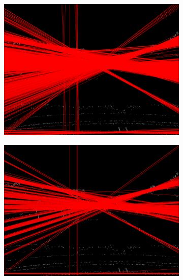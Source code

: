 \documentclass[12pt,a4paper]{report}
\begin{document}
\begin{figure}[!htb]
  \begin{minipage}{\linewidth}
    \centering
    \begin{subfigure}{0.49\textwidth}
      \includegraphics[width=\linewidth]{output/img2_q3_HOUGH_THETA_1_THRES_50.png}
    \end{subfigure}
    \begin{subfigure}{0.49\textwidth}
      \includegraphics[width=\linewidth]{output/img2_q3_HOUGH_THETA_3_THRES_50.png}
    \end{subfigure}


\end{minipage}
\end{figure}
\end{document}
